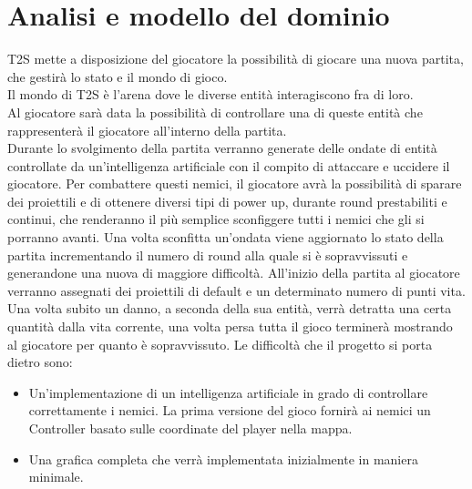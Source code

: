 \documentclass[a4paper,12pt]{report}
\begin{document}
\section{Analisi e modello del dominio}
T2S mette a disposizione del giocatore la possibilità di giocare una nuova partita, che gestirà lo stato e il mondo di gioco.
\\
Il mondo di T2S è l’arena dove le diverse entità interagiscono fra di loro.
\\
Al giocatore sarà data la possibilità di controllare una di queste entità che rappresenterà il giocatore all’interno della partita.
\\
Durante lo svolgimento della partita verranno generate delle ondate di entità controllate da un’intelligenza artificiale con il compito di attaccare e uccidere il giocatore.
Per combattere questi nemici, il giocatore avrà la possibilità di sparare dei proiettili e di ottenere diversi tipi di power up, durante round prestabiliti e continui, 
che renderanno il più semplice sconfiggere tutti i nemici che gli si porranno avanti.
Una volta sconfitta un’ondata viene aggiornato lo stato della partita incrementando il numero di round alla quale si è sopravvissuti 
e generandone una nuova di maggiore difficoltà.
All’inizio della partita al giocatore verranno assegnati dei proiettili di default e un determinato numero di punti vita.
Una volta subito un danno, a seconda della sua entità, verrà detratta una certa quantità dalla vita corrente, una volta persa tutta il gioco terminerà mostrando 
al giocatore per quanto è sopravvissuto.
Le difficoltà che il progetto si porta dietro sono:
\begin{itemize}
	\item Un’implementazione di un intelligenza artificiale in grado di controllare correttamente i nemici.
	La prima versione del gioco fornirà ai nemici un Controller basato sulle coordinate del player nella mappa.
	\item Una grafica completa che verrà implementata inizialmente in maniera minimale.
\end{itemize}
\end{document}
